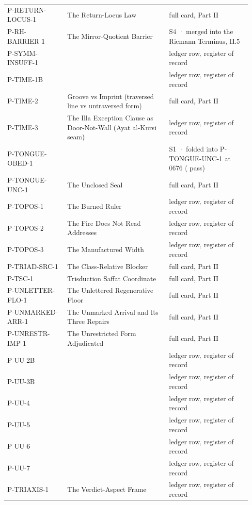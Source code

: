 \documentclass[10pt,twocolumn]{article}
\begin{document}
\begin{center}
\begin{longtable}{>{\raggedright\arraybackslash}p{}>{\raggedright\arraybackslash}p{}>{\raggedright\arraybackslash}p{}}
P-RETURN-LOCUS-1 & The Return-Locus Law & full card, Part II \\
P-RH-BARRIER-1 & The Mirror-Quotient Barrier & S4 · merged into the Riemann Terminus, II.5 \\
P-SYMM-INSUFF-1 &  & ledger row, register of record \\
P-TIME-1B &  & ledger row, register of record \\
P-TIME-2 & Groove vs Imprint (traversed line vs untraversed form) & full card, Part II \\
P-TIME-3 & The Illa Exception Clause as Door-Not-Wall (Ayat al-Kursi seam) & ledger row, register of record \\
P-TONGUE-OBED-1 &  & S1 · folded into P-TONGUE-UNC-1 at 0676 ( pass) \\
P-TONGUE-UNC-1 & The Unclosed Seal & full card, Part II \\
P-TOPOS-1 & The Burned Ruler & ledger row, register of record \\
P-TOPOS-2 & The Fire Does Not Read Addresses & ledger row, register of record \\
P-TOPOS-3 & The Manufactured Width & ledger row, register of record \\
P-TRIAD-SRC-1 & The Class-Relative Blocker & full card, Part II \\
P-TSC-1 & Trisduction Saffat Coordinate & full card, Part II \\
P-UNLETTER-FLO-1 & The Unlettered Regenerative Floor & full card, Part II \\
P-UNMARKED-ARR-1 & The Unmarked Arrival and Its Three Repairs & full card, Part II \\
P-UNRESTR-IMP-1 & The Unrestricted Form Adjudicated & full card, Part II \\
P-UU-2B &  & ledger row, register of record \\
P-UU-3B &  & ledger row, register of record \\
P-UU-4 &  & ledger row, register of record \\
P-UU-5 &  & ledger row, register of record \\
P-UU-6 &  & ledger row, register of record \\
P-UU-7 &  & ledger row, register of record \\
P-TRIAXIS-1 & The Verdict-Aspect Frame & ledger row, register of record \\
\end{longtable}
\end{center}
\end{document}
